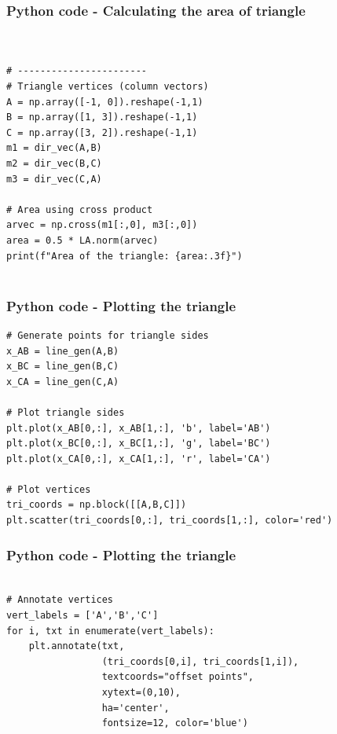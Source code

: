 \documentclass{beamer}
\begin{document}
\begin{frame}[fragile]                            
\frametitle{Python code - Calculating the area of triangle}                
\begin{lstlisting}


# -----------------------
# Triangle vertices (column vectors)
A = np.array([-1, 0]).reshape(-1,1)
B = np.array([1, 3]).reshape(-1,1)
C = np.array([3, 2]).reshape(-1,1)
m1 = dir_vec(A,B)
m2 = dir_vec(B,C)
m3 = dir_vec(C,A)

# Area using cross product
arvec = np.cross(m1[:,0], m3[:,0])
area = 0.5 * LA.norm(arvec)
print(f"Area of the triangle: {area:.3f}")


\end{lstlisting}
\end{frame}

\begin{frame}[fragile]                            
\frametitle{Python code - Plotting the triangle}                
\begin{lstlisting}
# Generate points for triangle sides
x_AB = line_gen(A,B)
x_BC = line_gen(B,C)
x_CA = line_gen(C,A)

# Plot triangle sides
plt.plot(x_AB[0,:], x_AB[1,:], 'b', label='AB')
plt.plot(x_BC[0,:], x_BC[1,:], 'g', label='BC')
plt.plot(x_CA[0,:], x_CA[1,:], 'r', label='CA')

# Plot vertices
tri_coords = np.block([[A,B,C]])
plt.scatter(tri_coords[0,:], tri_coords[1,:], color='red')
\end{lstlisting}
\end{frame}

\begin{frame}[fragile]                            
\frametitle{Python code - Plotting the triangle}                
\begin{lstlisting}

# Annotate vertices
vert_labels = ['A','B','C']
for i, txt in enumerate(vert_labels):
    plt.annotate(txt,
                 (tri_coords[0,i], tri_coords[1,i]),
                 textcoords="offset points",
                 xytext=(0,10),
                 ha='center',
                 fontsize=12, color='blue')
\end{lstlisting}
\end{frame}
\end{document}
